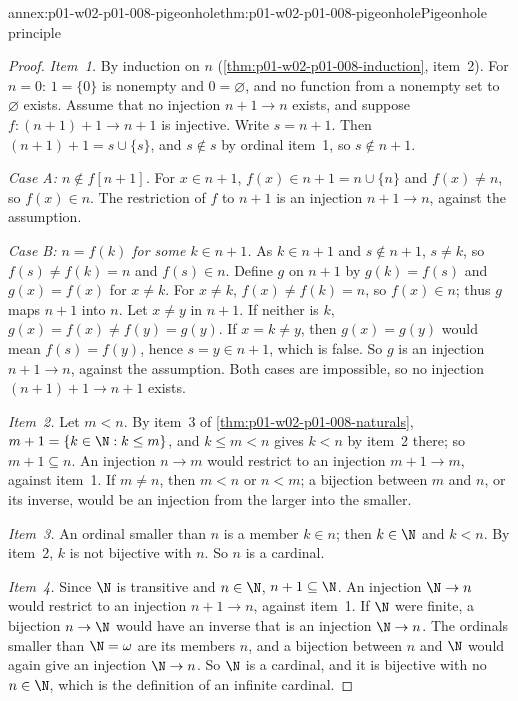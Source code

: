 \begin{annexitem}{annex:p01-w02-p01-008-pigeonhole}{thm:p01-w02-p01-008-pigeonhole}{Pigeonhole principle}
\begin{proof}
\emph{Item~1.} By induction on \(n\)
(\cref{thm:p01-w02-p01-008-induction}, item~2). For \(n=0\): \(1=\{0\}\)
is nonempty and \(0=\varnothing\), and no function from a nonempty set to
\(\varnothing\) exists. Assume that no injection \(n+1\to n\) exists, and
suppose \(f:(n+1)+1\to n+1\) is injective. Write \(s=n+1\). Then
\((n+1)+1=s\cup\{s\}\), and \(s\notin s\) by ordinal item~1, so
\(s\notin n+1\).

\emph{Case A: \(n\notin f[n+1]\).} For \(x\in n+1\), \(f(x)\in n+1=n\cup\{n\}\)
and \(f(x)\neq n\), so \(f(x)\in n\). The restriction of \(f\) to \(n+1\) is
an injection \(n+1\to n\), against the assumption.

\emph{Case B: \(n=f(k)\) for some \(k\in n+1\).} As \(k\in n+1\) and
\(s\notin n+1\), \(s\neq k\), so \(f(s)\neq f(k)=n\) and \(f(s)\in n\).
Define \(g\) on \(n+1\) by \(g(k)=f(s)\) and \(g(x)=f(x)\) for
\(x\neq k\). For \(x\neq k\), \(f(x)\neq f(k)=n\), so \(f(x)\in n\); thus
\(g\) maps \(n+1\) into \(n\). Let \(x\neq y\) in \(n+1\). If neither is
\(k\), \(g(x)=f(x)\neq f(y)=g(y)\). If \(x=k\neq y\), then \(g(x)=g(y)\)
would mean \(f(s)=f(y)\), hence \(s=y\in n+1\), which is false. So \(g\) is
an injection \(n+1\to n\), against the assumption. Both cases are
impossible, so no injection \((n+1)+1\to n+1\) exists.

\emph{Item~2.} Let \(m<n\). By item~3 of \cref{thm:p01-w02-p01-008-naturals},
\(m+1=\{k\in\N:k\leq m\}\), and \(k\leq m<n\) gives \(k<n\) by item~2 there;
so \(m+1\subseteq n\). An injection \(n\to m\) would restrict to an injection
\(m+1\to m\), against item~1. If \(m\neq n\), then \(m<n\) or \(n<m\); a
bijection between \(m\) and \(n\), or its inverse, would be an injection from
the larger into the smaller.

\emph{Item~3.} An ordinal smaller than \(n\) is a member \(k\in n\); then
\(k\in\N\) and \(k<n\). By item~2, \(k\) is not bijective with \(n\). So
\(n\) is a cardinal.

\emph{Item~4.} Since \(\N\) is transitive and \(n\in\N\), \(n+1\subseteq\N\).
An injection \(\N\to n\) would restrict to an injection \(n+1\to n\),
against item~1. If \(\N\) were finite, a bijection \(n\to\N\) would have an
inverse that is an injection \(\N\to n\). The ordinals smaller than
\(\N=\omega\) are its members \(n\), and a bijection between \(n\) and \(\N\)
would again give an injection \(\N\to n\). So \(\N\) is a cardinal, and it is
bijective with no \(n\in\N\), which is the definition of an infinite cardinal.


\end{proof}
\end{annexitem}
